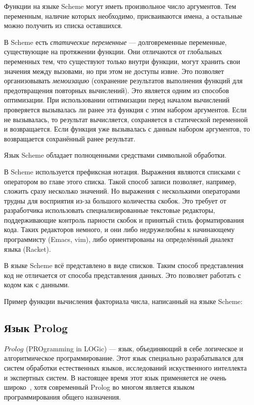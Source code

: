         Функции на языке Scheme могут иметь произвольное число аргументов.
        Тем переменным, наличие которых необходимо, присваиваются имена, а остальные можно получить из списка оставшихся.

        В Scheme есть \textit{статические переменные} --- долговременные переменные, существующие на протяжении функции.
        Они отличаются от глобальных переменных тем, что существуют только внутри функции, могут хранить свои значения между вызовами, но при этом не доступы извне.
        Это позволяет организовывать \textit{мемоизацию} (сохранение результатов выполнения функций для предотвращения повторных вычислений).
        Это является одним из способов оптимизации.
        При использовании оптимизации перед началом вычислений проверяется вызывалась ли ранее эта функция с этим набором аргументов.
        Если не вызывалась, то результат вычисляется, сохраняется в статической переменной и возвращается.
        Если функция уже вызывалась с данным набором аргументов, то возвращается сохранённый ранее результат.
        
        Язык Scheme обладает полноценными средствами символьной обработки.

        В Scheme используется префиксная нотация.
        Выражения являются списками с оператором во главе этого списка.
        Такой способ записи позволяет, например, сложить сразу несколько значений.
        Но выражения с несколькими операторами трудны для восприятия из-за большого количества скобок.
        Это требует от разработчика использовать специализированные текстовые редакторы, поддерживающие контроль парности скобок и принятый стиль форматирования кода.
        Таких редакторов немного, и они либо недружелюбны к начинающему программисту (Emacs, vim), либо ориентированы на определённый диалект языка (Racket).

        В языке Scheme всё представлено в виде списков.
        Таким способ представления код не отличается от способа представления данных.
        Это позволяет работать с кодом как с данными.
        \clearpage

        Пример функции вычисления факториала числа, написанный на языке Scheme:

        

    \subsection{Язык Prolog}
        $Prolog$ (PROgramming in LOGic) --- язык, объединяющий в себе логическое и алгоритмическое программирование.
        Этот язык специально разрабатывался для систем обработки естественных языков, исследований искуственного интеллекта и экспертных систем.
        В настоящее время этот язык применяется не очень широко~\cite{TIOBE}, хотя современный Prolog во многом является языком программирования общего назначения.


